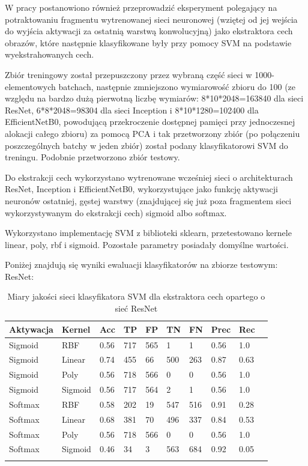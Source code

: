 \documentclass[polish,12pt]{aghthesis}
\begin{document}
\par W pracy postanowiono również przeprowadzić eksperyment polegający na potraktowaniu fragmentu wytrenowanej sieci neuronowej (wziętej od jej wejścia do wyjścia aktywacji za ostatnią warstwą konwolucyjną) jako ekstraktora cech obrazów, które następnie klasyfikowane były przy pomocy SVM na podstawie wyekstrahowanych cech.
\par Zbiór treningowy został przepuszczony przez wybraną część sieci w 1000-elementowych batchach, następnie zmniejszono wymiarowość zbioru do 100 (ze względu na bardzo dużą pierwotną liczbę wymiarów: 8*10*2048=163840 dla sieci ResNet, 6*8*2048=98304 dla sieci Inception i 8*10*1280=102400 dla EfficientNetB0, powodującą przekroczenie dostępnej pamięci przy jednoczesnej alokacji całego zbioru) za pomocą PCA i tak przetworzony zbiór (po połączeniu poszczególnych batchy w jeden zbiór) został podany klasyfikatorowi SVM do treningu. Podobnie przetworzono zbiór testowy.
\par Do ekstrakcji cech wykorzystano wytrenowane wcześniej sieci o architekturach ResNet, Inception i EfficientNetB0, wykorzystujące jako funkcję aktywacji neuronów ostatniej, gęstej warstwy (znajdującej się już poza fragmentem sieci wykorzystywanym do ekstrakcji cech) sigmoid albo softmax.
\par Wykorzystano implementację SVM z biblioteki sklearn, przetestowano kernele linear, poly, rbf i sigmoid. Pozostałe parametry posiadały domyślne wartości.
\vspace{3mm}
\par\noindent Poniżej znajdują się wyniki ewaluacji klasyfikatorów na zbiorze testowym:
\vspace{3mm}
\newline\noindent ResNet:
 \begin{longtable}[h!]{|m{1.9cm}|m{1.5cm}|m{1.2cm}|m{1.2cm}|m{1.2cm}|m{1.2cm}|m{1.2cm}|m{1.2cm}|m{1.2cm}|m{1.2cm}|}
 \hline
 Aktywacja & Kernel & Acc & TP & FP & TN & FN & Prec & Rec\\
 \hline
 Sigmoid & RBF & 0.56 & 717 & 565 & 1 & 1 & 0.56 & 1.0\\
 \hline
 Sigmoid & Linear & 0.74 & 455 & 66 & 500 & 263 & 0.87 & 0.63\\
 \hline
 Sigmoid & Poly & 0.56 & 718 & 566 & 0 & 0 & 0.56 & 1.0\\
 \hline
 Sigmoid & Sigmoid & 0.56 & 717 & 564 & 2 & 1 & 0.56 & 1.0\\
 \hline
 Softmax & RBF & 0.58 & 202 & 19 & 547 & 516 & 0.91 & 0.28\\
 \hline
 Softmax & Linear & 0.68 & 381 & 70 & 496 & 337 & 0.84 & 0.53\\
 \hline
 Softmax & Poly & 0.56 & 718 & 566 & 0 & 0 & 0.56 & 1.0\\
 \hline
 Softmax & Sigmoid & 0.46 & 34 & 3 & 563 & 684 & 0.92 & 0.05\\
 \hline
\caption{Miary jakości sieci klasyfikatora SVM dla ekstraktora cech opartego o sieć ResNet}
\label{table:14}
\end{longtable}
\end{document}
